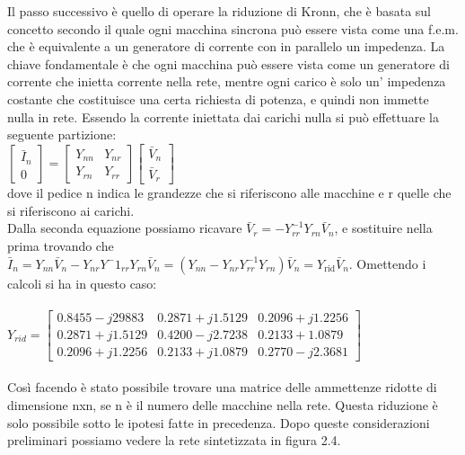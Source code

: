 \documentclass[Lau,noexaminfo]{sapthesis}
\begin{document}
	Il passo successivo è quello di operare la riduzione di Kronn, che è basata sul concetto secondo il quale ogni macchina sincrona può essere vista come una f.e.m. che è equivalente a un generatore di corrente con in parallelo un impedenza. La chiave fondamentale è che ogni macchina può essere vista come un generatore di corrente che inietta corrente nella rete, mentre ogni carico è solo un' impedenza costante che costituisce una certa richiesta di potenza, e quindi non immette nulla in rete. Essendo la corrente iniettata dai carichi nulla si può effettuare la seguente partizione:\\
	$\begin{bmatrix}
	\bar{I}_n\\
	0
	\end{bmatrix}=
	\begin{bmatrix}
	Y_{nn} & Y_{nr}\\
	Y_{rn} & Y_{rr}
	\end{bmatrix}
	\begin{bmatrix}
	\bar{V}_n\\
	\bar{V}_r
	\end{bmatrix}$\\
	dove il pedice n indica le grandezze che si riferiscono alle macchine e r quelle che si riferiscono ai carichi.\\
	Dalla seconda equazione possiamo ricavare $\bar{V}_r=-Y^{-1}_{rr}Y_{rn}\bar{V}_n$, e sostituire nella prima trovando che\\
	$\bar{I}_n=Y_{nn}\bar{V}_n-Y_{nr}Y^-1_{rr}Y_{rn}\bar{V}_n=(Y_{nn}-Y_{nr}Y^{-1}_{rr}Y_{rn})\bar{V}_n=Y_{\text{rid}}\bar{V}_n$. Omettendo i calcoli si ha in questo caso:\\\\
	$Y_{rid}=
	\begin{bmatrix}
	0.8455-j29883 & 0.2871+j1.5129 & 0.2096+j1.2256\\
	0.2871+j1.5129 & 0.4200-j2.7238 & 0.2133+1.0879\\
	0.2096+j1.2256 & 0.2133+j1.0879 & 0.2770-j2.3681
	\end{bmatrix}$\\\\
	Così facendo è stato possibile trovare una matrice delle ammettenze ridotte di dimensione nxn, se n è il numero delle macchine nella rete. Questa riduzione è solo possibile sotto le ipotesi fatte in precedenza.
	Dopo queste considerazioni preliminari possiamo vedere la rete sintetizzata in figura 2.4.
\end{document}
